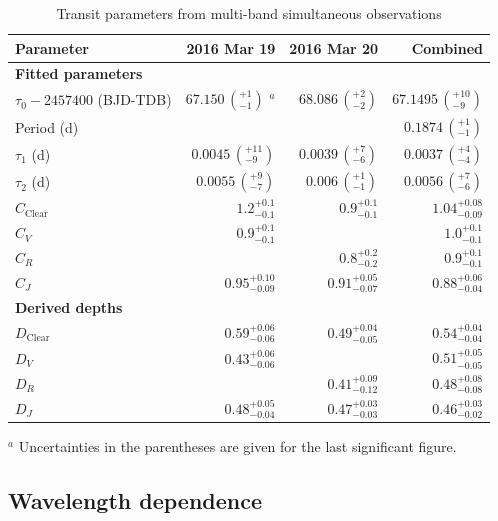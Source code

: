 \documentclass[useAMS,usenatbib]{mn2e}
\begin{document}
\begin{table}
\centering
\caption{\label{tab:simultaneous_params}Transit parameters from multi-band simultaneous observations}
\begin{tabular}{lrrr}
\hline\hline
Parameter & 2016 Mar 19 & 2016 Mar 20 & Combined\\
\hline
\textbf{Fitted parameters} & & & \\
$\tau_0-2457400$ (BJD-TDB) & $67.150\,\left(_{-1}^{+1} \right)$ $^a$ & $68.086 \, \left(_{-2}^{+2} \right)$ & $67.1495 \, \left(_{-9}^{+10} \right)$\\
Period (d) &  &  & $0.1874\, \left(_{-1}^{+1} \right)$ \\ 
$\tau_1$ (d) & $0.0045\, \left(_{-9}^{+11} \right)$ & $0.0039 \,\left(_{-6}^{+7}\right)$ & $0.0037 \,\left(_{-4}^{+4} \right)$ \\
$\tau_2$ (d) & $0.0055\,\left(_{-7}^{+9}\right)$ & $0.006\,\left(_{-1}^{+1}\right)$ & $0.0056\,\left(_{-6}^{+7}\right)$ \\
$C_\mathrm{Clear}$ & $1.2_{-0.1}^{+0.1}$ & $0.9_{-0.1}^{+0.1}$ & $1.04_{-0.09}^{+0.08}$ \\
$C_V$ & $0.9_{-0.1}^{+0.1}$ &  & $1.0_{-0.1}^{+0.1}$\\
$C_R$ &  & $0.8_{-0.2}^{+0.2}$ & $0.9_{-0.1}^{+0.1}$ \\
$C_J$ & $0.95_{-0.09}^{+0.10}$ & $0.91_{-0.07}^{+0.05}$ & $0.88_{-0.04}^{+0.06}$ \\
\textbf{Derived depths} && \\
$D_\mathrm{Clear}$  & $0.59_{-0.06}^{+0.06}$ & $0.49_{-0.05}^{+0.04}$ & $0.54_{-0.04}^{+0.04}$ \\
$D_V$ & $0.43_{-0.06}^{+0.06}$  &  & $0.51_{-0.05}^{+0.05}$\\
$D_R$ &  & $0.41_{-0.12}^{+0.09}$ & $0.48_{-0.08}^{+0.08}$\\
$D_J$  & $0.48_{-0.04}^{+0.05}$ & $0.47_{-0.03}^{+0.03}$ & $0.46_{-0.02}^{+0.03}$\\
\hline
\end{tabular}
    \begin{flushleft}
    $^a$ Uncertainties in the parentheses are given for the last significant figure.\\
\end{flushleft}
\end{table}

\subsection{Wavelength dependence}
\label{sec:wave_depend}
\end{document}
